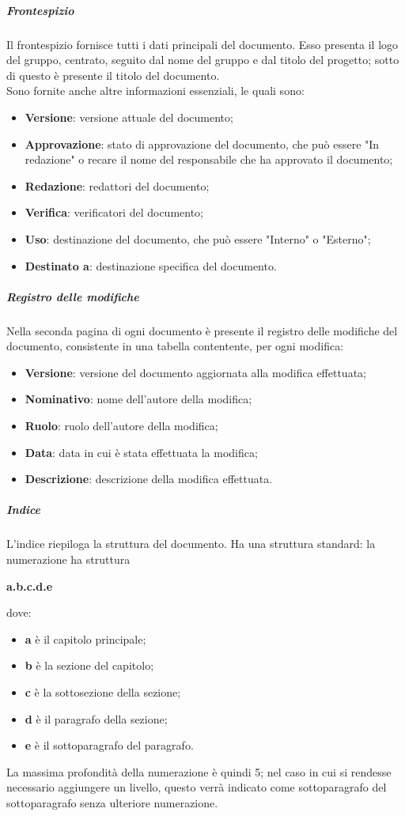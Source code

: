 \documentclass[../norme-di-progetto.tex]{subfiles}
\begin{document}
\subparagraph{Frontespizio}
Il frontespizio fornisce tutti i dati principali del documento. Esso presenta il logo del gruppo, centrato, seguito dal nome del gruppo e dal titolo del progetto; sotto di questo è presente il titolo del documento. \\
Sono fornite anche altre informazioni essenziali, le quali sono:
\begin{itemize}
  \item \textbf{Versione}: versione attuale del documento;
  \item \textbf{Approvazione}: stato di approvazione del documento, che può essere "In redazione" o recare il nome del responsabile che ha approvato il documento;
  \item \textbf{Redazione}: redattori del documento;
  \item \textbf{Verifica}: verificatori del documento;
  \item \textbf{Uso}: destinazione del documento, che può essere "Interno" o "Esterno";
  \item \textbf{Destinato a}: destinazione specifica del documento.
\end{itemize}
\subparagraph{Registro delle modifiche}
Nella seconda pagina di ogni documento è presente il registro delle modifiche del documento, consistente in una tabella contentente, per ogni modifica:
\begin{itemize}
  \item \textbf{Versione}: versione del documento aggiornata alla modifica effettuata;
  \item \textbf{Nominativo}: nome dell'autore della modifica;
  \item \textbf{Ruolo}: ruolo dell'autore della modifica;
  \item \textbf{Data}: data in cui è stata effettuata la modifica;
  \item \textbf{Descrizione}: descrizione della modifica effettuata.
\end{itemize}
\subparagraph{Indice}
L'indice riepiloga la struttura del documento. Ha una struttura standard: la numerazione ha struttura \begin{center}
  \centering
  \textbf{a.b.c.d.e}
\end{center} dove:
\begin{itemize}
  \item \textbf{a} è il capitolo principale;
  \item \textbf{b} è la sezione del capitolo;
  \item \textbf{c} è la sottosezione della sezione;
  \item \textbf{d} è il paragrafo della sezione;
  \item \textbf{e} è il sottoparagrafo del paragrafo.
\end{itemize}
La massima profondità della numerazione è quindi 5; nel caso in cui si rendesse necessario aggiungere un livello, questo verrà indicato come sottoparagrafo del sottoparagrafo senza ulteriore numerazione.
\end{document}
